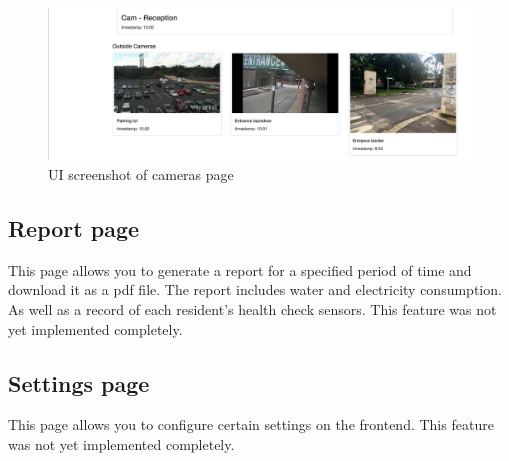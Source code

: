 \begin{figure}[H]
	\centering
	\includegraphics[width =1\textwidth]{images/uiCameras2.png}
	\caption{UI screenshot of cameras page}
\end{figure}

\subsection{Report page}

This page allows you to generate a report for a specified period of time and download it as a pdf file.
The report includes water and electricity consumption. As well as a record of each resident's health check sensors. This feature was not yet implemented completely.


\subsection{Settings page}
This page allows you to configure certain settings on the frontend.
This feature was not yet implemented completely.
